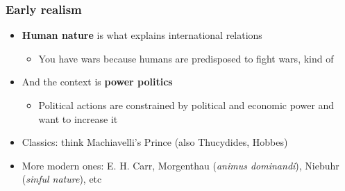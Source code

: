 \documentclass[aspectratio=43]{beamer}
\begin{document}
\begin{frame}
\frametitle{Early realism}
\centering

\begin{itemize}
  \item \textbf{Human nature} is what explains international relations
  \begin{itemize}
    \item You have wars because humans are predisposed to fight wars, kind of
  \end{itemize}
  \item And the context is \textbf{power politics}
  \begin{itemize}
    \item Political actions are constrained by political and economic power and want to increase it
  \end{itemize}
  \item<2-> Classics: think Machiavelli's Prince (also Thucydides, Hobbes)
  \item<2-> More modern ones: E. H. Carr, Morgenthau (\textit{animus dominandi}), Niebuhr (\textit{sinful nature}), etc
\end{itemize}

\end{frame}
\end{document}
